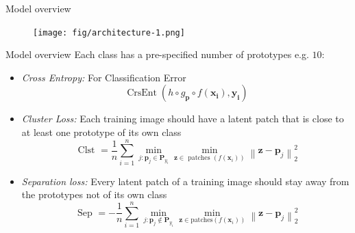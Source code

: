 \documentclass[10pt,usepdftitle=false,aspectratio=169]{beamer}
\begin{document}



\begin{frame}{Model overview}
\begin{figure}
    \centering
    \texttt{[image: fig/architecture-1.png]}
    \label{fig:my_label}
\end{figure}
\end{frame}

\begin{frame}{Model overview}
Each class has a pre-specified number of prototypes e.g. $10$:
\vspace{0.3cm}
\begin{itemize}
    \item \emph{Cross Entropy:} For Classification Error
    \begin{equation}
        \operatorname{CrsEnt}\left(h \circ g_{\mathbf{p}} \circ f\left(\mathbf{x}_{\mathbf{i}}\right), \mathbf{y}_{\mathbf{i}}\right)
    \end{equation}
    \item \emph{Cluster Loss:}  Each training image should have a latent patch that is close to at least one prototype of its own class
    \begin{equation}
\text { Clst }=\frac{1}{n} \sum_{i=1}^{n} \min _{j: \mathbf{p}_{j} \in \mathbf{P}_{y_{i}}} \min_{\mathbf{z} \in \text { patches }\left(f\left(\mathbf{x}_{i}\right)\right)}\left\|\mathbf{z}-\mathbf{p}_{j}\right\|_{2}^{2}
\end{equation}
\item \emph{Separation loss:}
Every latent patch of a training image should stay away from the prototypes not of its own class
\begin{equation}
\text { Sep }=-\frac{1}{n} \sum_{i=1}^{n} \min _{j: \mathbf{p}_{j} \notin \mathbf{P}_{y_{i}}} \min_{\mathbf{z} \in \text{patches}\left(f\left(\mathbf{x}_{i}\right)\right)}\left\|\mathbf{z}-\mathbf{p}_{j}\right\|_{2}^{2}
\end{equation}
\end{itemize}
\end{frame}
\end{document}
